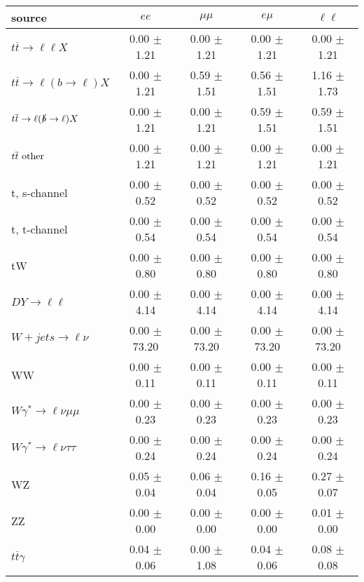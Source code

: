 \begin{tabular}{l|cccc} \hline\hline
source & $ee$ & $\mu\mu$ & $e\mu$ & $\ell\ell $ \\
\hline
$t\overline{t} \rightarrow \ell \ell X$ &  0.00 $\pm$  1.21 &  0.00 $\pm$  1.21 &  0.00 $\pm$  1.21 &  0.00 $\pm$  1.21 \\
$t\overline{t} \rightarrow \ell (b \rightarrow \ell) X$ &  0.00 $\pm$  1.21 &  0.59 $\pm$  1.51 &  0.56 $\pm$  1.51 &  1.16 $\pm$  1.73 \\
$t\overline{t} \rightarrow \ell (\slashed b \rightarrow \ell) X$ &  0.00 $\pm$  1.21 &  0.00 $\pm$  1.21 &  0.59 $\pm$  1.51 &  0.59 $\pm$  1.51 \\
        $t\overline{t}\ \rm{other}$ &  0.00 $\pm$  1.21 &  0.00 $\pm$  1.21 &  0.00 $\pm$  1.21 &  0.00 $\pm$  1.21 \\
\hline
                       t, s-channel &  0.00 $\pm$  0.52 &  0.00 $\pm$  0.52 &  0.00 $\pm$  0.52 &  0.00 $\pm$  0.52 \\
                       t, t-channel &  0.00 $\pm$  0.54 &  0.00 $\pm$  0.54 &  0.00 $\pm$  0.54 &  0.00 $\pm$  0.54 \\
                                 tW &  0.00 $\pm$  0.80 &  0.00 $\pm$  0.80 &  0.00 $\pm$  0.80 &  0.00 $\pm$  0.80 \\
\hline
         $DY \rightarrow \ell \ell$ &  0.00 $\pm$  4.14 &  0.00 $\pm$  4.14 &  0.00 $\pm$  4.14 &  0.00 $\pm$  4.14 \\
      $W+jets \rightarrow \ell \nu$ &  0.00 $\pm$ 73.20 &  0.00 $\pm$ 73.20 &  0.00 $\pm$ 73.20 &  0.00 $\pm$ 73.20 \\
                                 WW &  0.00 $\pm$  0.11 &  0.00 $\pm$  0.11 &  0.00 $\pm$  0.11 &  0.00 $\pm$  0.11 \\
\hline
$W\gamma^{*} \rightarrow \ell \nu \mu\mu$ &  0.00 $\pm$  0.23 &  0.00 $\pm$  0.23 &  0.00 $\pm$  0.23 &  0.00 $\pm$  0.23 \\
$W\gamma^{*} \rightarrow \ell \nu \tau\tau$ &  0.00 $\pm$  0.24 &  0.00 $\pm$  0.24 &  0.00 $\pm$  0.24 &  0.00 $\pm$  0.24 \\
                                 WZ &  0.05 $\pm$  0.04 &  0.06 $\pm$  0.04 &  0.16 $\pm$  0.05 &  0.27 $\pm$  0.07 \\
                                 ZZ &  0.00 $\pm$  0.00 &  0.00 $\pm$  0.00 &  0.00 $\pm$  0.00 &  0.01 $\pm$  0.00 \\
\hline
              $t\overline{t}\gamma$ &  0.04 $\pm$  0.06 &  0.00 $\pm$  1.08 &  0.04 $\pm$  0.06 &  0.08 $\pm$  0.08 \\

\end{tabular}
